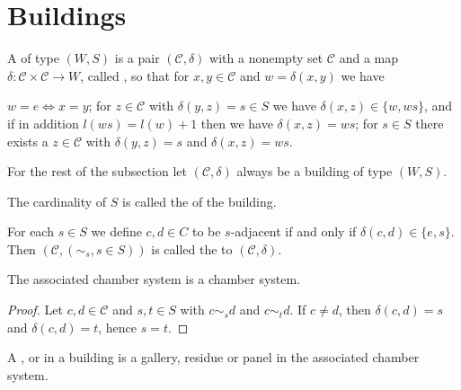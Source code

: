 \section{Buildings}

\begin{defi}
	A  of type $(W,S)$ is a pair $(\mathcal{C}, \delta)$ with a nonempty set $\mathcal{C}$ and a map $\delta : \mathcal{C} \times \mathcal{C} \to W$, called , so that for $x,y \in \mathcal C$ and $w = \delta(x,y)$ we have
	\begin{axioms}
		 $w = e \iff x = y$;
		 for $z \in \mathcal C$ with $\delta(y,z) = s \in S$ we have $\delta(x,z) \in \{w,ws\}$, and if in addition $l(ws) = l(w) + 1$ then we have $\delta(x,z) = ws$;
		 for $s \in S$ there exists a $z \in \mathcal C$ with $\delta(y,z) = s$ and $\delta(x,z) = ws$.
	\end{axioms}
\end{defi}

For the rest of the subsection let $(\mathcal{C}, \delta)$ always be a building of type $(W,S)$.

\begin{defi}
	The cardinality of $S$ is called the  of the building.
\end{defi}

\begin{defi}
	For each $s \in S$ we define $c,d \in C$ to be $s$-adjacent if and only if $\delta(c,d) \in \{e,s\}$. Then $(\mathcal{C}, (\sim_s, s \in S))$ is called the  to $(\mathcal{C}, \delta)$.
\end{defi}

\begin{prop}
	The associated chamber system is a chamber system.

	\begin{proof}
		Let $c,d \in \mathcal{C}$ and $s,t \in S$ with $c \sim_s d$ and $c \sim_t d$. If $c \neq d$, then $\delta(c,d) = s$ and $\delta(c,d) = t$, hence $s = t$.
	\end{proof}
\end{prop}

\begin{defi}
	A ,  or  in a building is a gallery, residue or panel in the associated chamber system.
\end{defi}

